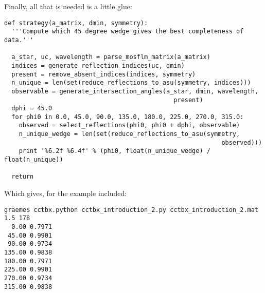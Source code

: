 \documentclass[a4paper, 11pt]{article}
\begin{document}
Finally, all that is needed is a little glue:

{\small
\begin{verbatim}
def strategy(a_matrix, dmin, symmetry):
  '''Compute which 45 degree wedge gives the best completeness of data.'''

  a_star, uc, wavelength = parse_mosflm_matrix(a_matrix)
  indices = generate_reflection_indices(uc, dmin)
  present = remove_absent_indices(indices, symmetry)
  n_unique = len(set(reduce_reflections_to_asu(symmetry, indices)))
  observable = generate_intersection_angles(a_star, dmin, wavelength,
                                              present)
  dphi = 45.0
  for phi0 in 0.0, 45.0, 90.0, 135.0, 180.0, 225.0, 270.0, 315.0:
    observed = select_reflections(phi0, phi0 + dphi, observable)
    n_unique_wedge = len(set(reduce_reflections_to_asu(symmetry,
                                                           observed)))
    print '%6.2f %6.4f' % (phi0, float(n_unique_wedge) / float(n_unique))

  return
\end{verbatim}
}

Which gives, for the example included:

{\small
\begin{verbatim}
graeme$ cctbx.python cctbx_introduction_2.py cctbx_introduction_2.mat 1.5 178 
  0.00 0.7971
 45.00 0.9901
 90.00 0.9734
135.00 0.9838
180.00 0.7971
225.00 0.9901
270.00 0.9734
315.00 0.9838
\end{verbatim}
}
\end{document}
